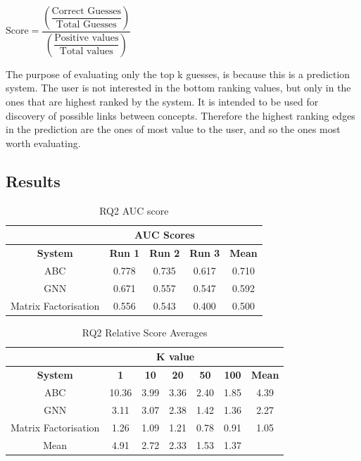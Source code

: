 \documentclass{l4proj}
\begin{document}
\begin{center}
    $\text{Score} = \dfrac{\left ( \dfrac{\text{Correct Guesses}}{\text{Total Guesses}}\right )}{\left ( \dfrac{\text{Positive values}}{\text{Total values}}\right )}$ 
\end{center}

The purpose of evaluating only the top k guesses, is because this is a prediction system. The user is not interested in the bottom ranking values, but only in the ones that are highest ranked by the system. It is intended to be used for discovery of possible links between concepts. Therefore the highest ranking edges in the prediction are the ones of most value to the user, and so the ones most worth evaluating. \\

\subsection{Results}

\begin{table}[h]
    \centering
    \caption{RQ2 AUC score}
    \label{tab:rq2_auc}
    \begin{tabular}{|c|c|c|c|c|}
    \hline
    & \multicolumn{3}{|c|}{AUC Scores} & \\ \hline
    \textbf{System} & \textbf{Run 1} & \textbf{Run 2} & \textbf{Run 3} & \textbf{Mean}\\ \hline
    ABC & 0.778 & 0.735 & 0.617 & 0.710 \\ \hline
    GNN & 0.671 & 0.557 & 0.547 & 0.592 \\ \hline
    Matrix Factorisation & 0.556 & 0.543 & 0.400 & 0.500 \\ \hline
    \end{tabular}
\end{table}

\begin{table}[h]
    \centering
    \caption{RQ2 Relative Score Averages}
    \label{tab:rq2_rsa}
    \begin{tabular}{|c|c|c|c|c|c|c|}
    \hline
    & \multicolumn{5}{|c|}{K value} & \\ \hline
    \textbf{System} & \textbf{1} & \textbf{10} & \textbf{20} & \textbf{50} & \textbf{100} & \textbf{Mean}\\ \hline
    ABC & 10.36 & 3.99 & 3.36 & 2.40 & 1.85 & 4.39\\ \hline
    GNN & 3.11 & 3.07 & 2.38 & 1.42 & 1.36 & 2.27\\ \hline
    Matrix Factorisation & 1.26 & 1.09 & 1.21 & 0.78 & 0.91 & 1.05\\ \hline
    Mean & 4.91 & 2.72 & 2.33 & 1.53 & 1.37 & \\ \hline
    \end{tabular}
\end{table}
\end{document}
